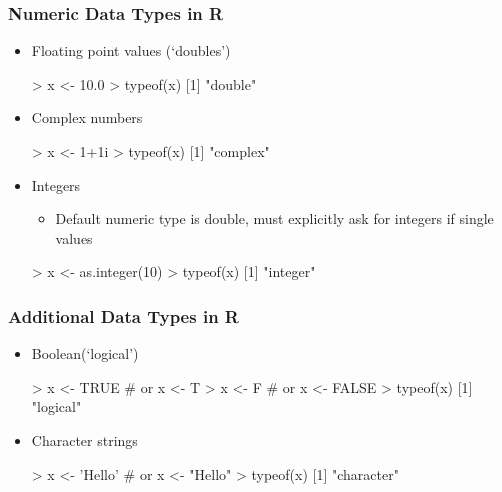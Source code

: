 \documentclass{beamer}
\begin{document}
\begin{frame}[fragile]
  \frametitle{Numeric Data Types in R}
\begin{itemize}

\item Floating point values (`doubles')
\begin{Rcode}
> x <- 10.0
> typeof(x)
[1] "double"
\end{Rcode}

\item Complex numbers
\begin{Rcode}
> x <- 1+1i
> typeof(x)
[1] "complex"
\end{Rcode}

\item Integers
\begin{itemize}
	\item Default numeric type is double, must explicitly ask for integers if single values
\end{itemize}
\begin{Rcode}
> x <- as.integer(10)
> typeof(x)
[1] "integer"
\end{Rcode}

\end{itemize}

\end{frame}

\begin{frame}[fragile]
  \frametitle{Additional Data Types in R}
\begin{itemize}

\item Boolean(`logical')
\begin{Rcode}
> x <- TRUE # or x <- T
> x <- F # or x <- FALSE
> typeof(x)
[1] "logical"
\end{Rcode}

\item Character strings
\begin{Rcode}
> x <- 'Hello' # or x <- "Hello"
> typeof(x)
[1] "character"
\end{Rcode}

\end{itemize}

\end{frame}
\end{document}
